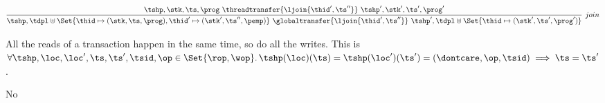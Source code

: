 \[
    \infer[join]{%
        \tshp, \tdpl \uplus \Set{ \thid \mapsto (\stk, \ts, \prog), \thid' \mapsto (\stk', \ts'', \pemp) } \ \globaltransfer{\ljoin{\thid',\ts''}} \  \tshp', \tdpl \uplus \Set{ \thid \mapsto (\stk', \ts', \prog')}
    }{%
        \tshp, \stk, \ts, \prog \ \threadtransfer{\ljoin{\thid',\ts''}} \  \tshp', \stk', \ts', \prog' 
    }
\]

\begin{lem}
    All the reads of a transaction happen in the same time, so do all the writes. This is 
    \( \forall \tshp, \loc, \loc', \ts, \ts', \tsid, \op \in \Set{\rop, \wop} \ldotp \tshp(\loc)(\ts) =  \tshp(\loc')(\ts') = (\dontcare, \op, \tsid) \implies \ts = \ts' \).
\end{lem}

\begin{lem}
    No 
\end{lem}
